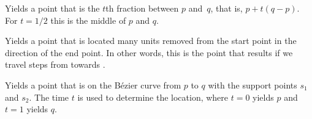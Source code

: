 \begin{command}{\pgfpointlineattime{}}
  Yields a point that is the $t$th fraction between $p$
  and~$q$, that is, $p + t(q-p)$. For $t=1/2$ this is the middle of
  $p$ and $q$.

\begin{codeexample}[]
\end{codeexample}
\end{command}

\begin{command}{\pgfpointlineatdistance{}}
  Yields a point that is located  many units removed
  from the start point in the direction of the end point. In other
  words, this is the point that results if we travel 
  steps from  towards .
  \example
\begin{codeexample}[]
\end{codeexample}
\end{command}

\begin{command}{\pgfpointcurveattime{}}
  Yields a point that is on the B\'ezier curve from $p$ to $q$ with the
  support points $s_1$ and $s_2$. The time $t$ is used to determine
  the location, where $t=0$ yields $p$ and $t=1$ yields $q$.

\begin{codeexample}[]
\end{codeexample}
\end{command}

